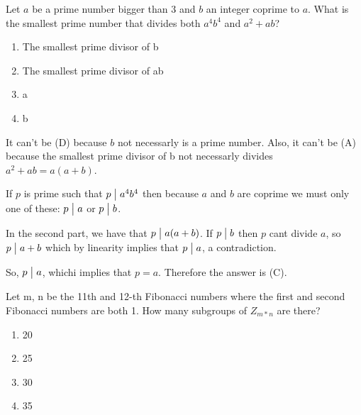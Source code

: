 \documentclass[12pt]{report}
\newcounter{it}
\theoremstyle{largebreak}
\newcommand\divides{\ensuremath{\bigm|}}
\begin{document}
    \begin{excer}
        Let \(a\) be a prime number bigger than 3 and \(b\) an integer coprime to \(a\). What is the smallest prime number that divides both \(a^4 b^4\) and \(a^2+ab\)?
        \begin{enumerate}[label = \textit{(\Alph*)}]
            \item The smallest prime divisor of b
            \item The smallest prime divisor of ab
            \item a
            \item b
        \end{enumerate}
    \end{excer}

    \begin{sol}
        It can't be (D) because $b$ not necessarly is a prime number. Also, it can't be (A) because the smallest prime divisor of b not necessarly divides $a^2+ab=a(a+b)$.

        If $p$ is prime such that $p\divides a^4b^4$ then because $a$ and $b$ are coprime we must only one of these: $p\divides a$ or $p\divides b$.

        In the second part, we have that $p\divides a(a+b)$. If $p\divides b$ then $p$ cant divide $a$, so $p\divides a+b$ which by linearity implies that $p\divides a$, a contradiction.

        So, $p\divides a$, whichi implies that $p=a$. Therefore the answer is (C).

    \end{sol}

    \begin{excer}
        Let m, n be the 11th and 12-th Fibonacci numbers where the first and second Fibonacci numbers are both 1. How many subgroups of $Z_{m*n}$ are there?
        \begin{enumerate}[label = \textit{(\Alph*)}]
            \item 20
            \item 25
            \item 30
            \item 35
        \end{enumerate}
    \end{excer}
\end{document}
